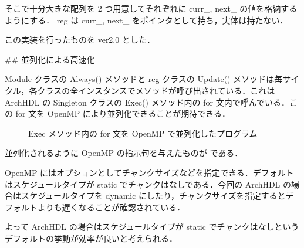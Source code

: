 そこで十分大きな配列を 2 つ用意してそれぞれに curr_, next_ の値を格納するようにする．
reg は curr_, next_ をポインタとして持ち，実体は持たない．

この実装を行ったものを ver2.0 とした．




## 並列化による高速化 \label{ss:parallel}

Module クラスの Always() メソッドと
reg クラスの Update() メソッドは毎サイクル，各クラスの全インスタンスでメソッドが呼び出されている．これは
ArchHDL の Singleton クラスの Exec() メソッド内の
for 文内で呼んでいる．この
for 文を OpenMP により並列化できることが期待できる．

\begin{figure}[t]
 
 \caption{Exec メソッド内の for 文を OpenMP で並列化したプログラム}
 \label{src:exec_openmp}
\end{figure}

並列化されるように OpenMP の指示句を与えたものが  である．

OpenMP にはオプションとしてチャンクサイズなどを指定できる．デフォルトはスケジュールタイプが
static でチャンクはなしである．今回の ArchHDL の場合はスケジュールタイプを dynamic
にしたり，チャンクサイズを指定するとデフォルトよりも遅くなることが確認されている．

よって ArchHDL の場合はスケジュールタイプが static でチャンクはなしというデフォルトの挙動が効率が良いと考えられる．

